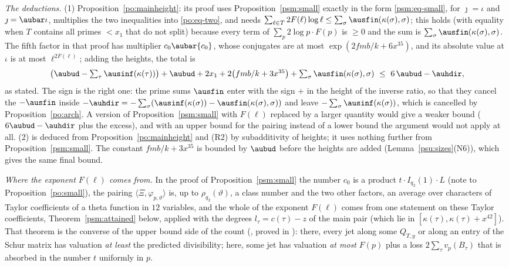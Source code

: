 \documentclass[10pt]{amsart}
\theoremstyle{definition}
\theoremstyle{remark}
\begin{document}
\emph{The deductions.} (1) Proposition~\ref{po:mainheight}: its proof uses
Proposition~\ref{psm:small} exactly in the form \eqref{psm:eq-small}, for $\jmath=\iota$ and
$\jmath=\aubar\iota$, multiplies the two inequalities into \eqref{po:eq-two}, and needs
$\sum_{\ell\in T}2F(\ell)\log\ell\le\sum_\sigma\ausfin(\kappa(\sigma),\sigma)$; this holds (with
equality when $T$ contains all primes $<x_1$ that do not split) because every term of
$\sum_p2\log p\cdot F(p)$ is $\ge0$ and the sum is $\sum_\sigma\ausfin(\kappa(\sigma),\sigma)$.
The fifth factor in that proof has multiplier $c_0\aubar{c_0}$, whose conjugates are at most
$\exp(2fmb/k+6x^{35})$, and its absolute value at $\iota$ is at most $\ell^{2F(\ell)}$; adding the
heights, the total is
\[
\bigl(\aubud-\textstyle\sum_\tau\ausinf(\kappa(\tau))\bigr)+\aubud+2x_1+2\bigl(fmb/k+3x^{35}
\bigr)+\textstyle\sum_\sigma\ausfin(\kappa(\sigma),\sigma)\ \le\ 6\,\aubud-\auhdir ,
\]
as stated. The sign is the right one: the prime sums $\ausfin$ enter with the sign $+$ in the
height of the inverse ratio, so that they cancel the $-\ausfin$ inside $-\auhdir=-\sum_\sigma
(\ausinf(\kappa(\sigma))-\ausfin(\kappa(\sigma),\sigma))$ and leave $-\sum_\sigma\ausinf
(\kappa(\sigma))$, which is cancelled by Proposition~\ref{po:arch}. A version of
Proposition~\ref{psm:small} with $F(\ell)$ replaced by a larger quantity would give a weaker bound
($6\aubud-\auhdir$ plus the excess), and with an upper bound for the pairing instead of a lower
bound the argument would not apply at all. (2) {\cite[Proposition~14.42]{P46}} is deduced from
Proposition~\ref{po:mainheight} and (R2) by subadditivity of heights; it uses nothing further from
Proposition~\ref{psm:small}. The constant $fmb/k+3x^{35}$ is bounded by
$\aubud$ before the heights are added (Lemma~\ref{psu:sizes}(N6)), which gives the same final bound.

\emph{Where the exponent $F(\ell)$ comes from.} In the proof of Proposition~\ref{psm:small} the
number $c_0$ is a product $t\cdot I_{q_2}(1)\cdot L$ (note to Proposition~\ref{po:small}), the
pairing $\langle\Xi,\varphi_{p,\vartheta}\rangle$ is, up to $\rho_{q_2}(\vartheta)$, a class number
and the two other factors, an average over characters of Taylor coefficients of a theta function in
$12$ variables, and the whole of the exponent $F(\ell)$ comes from one statement on these Taylor
coefficients, Theorem~\ref{psm:attained} below, applied with the degrees $l_\tau=c(\tau)-z$ of the
main pair (which lie in $[\kappa(\tau),\kappa(\tau)+x^{42}]$). That theorem is the converse of the
upper bound side of the count ({\cite[Proposition~14.10]{P46}}, proved in {\cite[\S4.2]{P49}}): there,
every jet along some $Q_{T,y}$ or along an entry of the Schur matrix has valuation \emph{at least} the predicted divisibility; here,
some jet has valuation \emph{at most} $F(p)$ plus a loss $2\sum_\tau v_p(B_\tau)$ that is absorbed in
the number $t$ uniformly in $p$.
\end{document}
